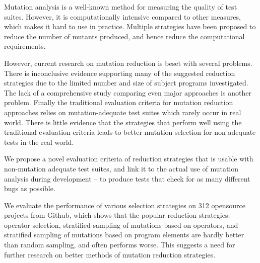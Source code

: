 Mutation analysis is a well-known method for measuring the quality of
test suites. However, it is computationally intensive compared to other
measures, which makes it hard to use in practice. Multiple strategies have
been proposed to reduce the number of mutants produced, and hence reduce
the computational requirements.

%
However, current research on mutation reduction is beset with several
problems. There is inconclusive evidence supporting many of the suggested
reduction strategies due to the limited number and size of subject programs
investigated. The lack of a comprehensive study comparing even major approaches
is another problem. Finally the traditional evaluation criteria for mutation
reduction approaches relies on mutation-adequate test suites which rarely occur
in real world. There is little evidence that the strategies that perform well
using the traditional evaluation criteria leads to better mutation selection
for non-adequate tests in the real world.


We propose a novel evaluation criteria of reduction strategies that is
usable with non-mutation adequate test suites, and link it to the actual
use of mutation analysis during development -- to produce tests that check
for as many different bugs as possible.

We evaluate the performance of various selection strategies on 312 opensource
projects from Github, which shows that the popular reduction strategies:
operator selection, stratified sampling of mutations based on operators,
and stratified sampling of mutations based on program elements are hardly
better than random sampling, and often performs worse.  This suggests a need
for further research on better methods of mutation reduction strategies.


